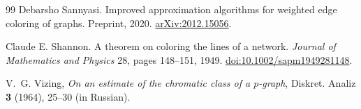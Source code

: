 \documentclass[11pt]{article}
\theoremstyle{definition}\newtheorem{algorithm}{Algorithm}[section]
\numberwithin{equation}{section}
\theoremstyle{remark}\newtheorem*{remark}{Remark}
\begin{document}
\begin{thebibliography}{99}
 Debarsho Sannyasi.
Improved approximation algorithms for weighted edge coloring of graphs.
Preprint, 2020.
\href{https://arxiv.org/abs/2012.15056}{arXiv:2012.15056}.

 Claude E. Shannon.
A theorem on coloring the lines of a network.
\emph{Journal of Mathematics and Physics} 28, pages 148--151, 1949.
\href{https://doi.org/10.1002/sapm1949281148}{doi:10.1002/sapm1949281148}.

V.~G. Vizing,
\emph{On an estimate of the chromatic class of a \(p\)-graph},
Diskret. Analiz \textbf{3} (1964), 25--30 (in Russian).

\end{thebibliography}
\end{document}
